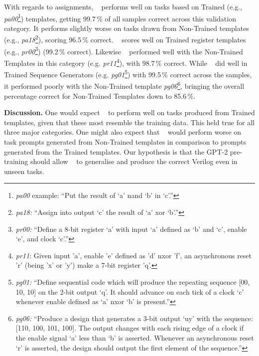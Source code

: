 With regards to assignments, \sol~ performs  well on tasks based on Trained (e.g., \textit{pa00}\footnote{\textit{pa00} example: ``Put the result of `a' nand `b' in `c'.''}) templates, getting 99.7\,\% of all samples correct across this validation category.
It performs slightly worse on tasks drawn from Non-Trained templates (e.g., \textit{pa18}\footnote{\textit{pa18:} ``Assign into output `c' the result of `a' xor `b'.''}), scoring 96.5\,\% correct.
\sol~ scores well on Trained register templates (e.g., \textit{pr00}\footnote{\textit{pr00:} ``Define a 8-bit register `a' with input `a' defined as `b' and `c', enable `e', and clock `c'.''}) (99.2\,\% correct).
Likewise \sol~ performed well with the Non-Trained Templates in this category (e.g. \textit{pr11}\footnote{\textit{pr11}: Given input 'a', enable 'e' defined as 'd' nxor 'f', an asynchronous reset 'r' (being 'x' or 'y') make a 7-bit register 'q'.}), with 98.7\,\% correct.
While \sol~ did well in Trained Sequence Generators (e.g. \textit{pg01}\footnote{\textit{pg01:} ``Define sequential code which will produce the repeating sequence [00, 10, 10] on the 2-bit output `q'. It should advance on each tick of a clock `c' whenever enable defined as `a' nxor `b' is present.''}) with 99.5\,\% correct across the samples, it performed poorly with the Non-Trained template \textit{pg06}\footnote{\textit{pg06:} ``Produce a design that generates a 3-bit output `uy' with the sequence: [110, 100, 101, 100]. The output changes with each rising edge of a clock if the enable signal `a' less than `b' is asserted. Whenever an asynchronous reset `r' is asserted, the design should output the first element of the sequence.''}, bringing the overall percentage correct for Non-Trained Templates down to 85.6\,\%.
 
\textbf{Discussion.} 
One would expect \sol~ to perform well on tasks produced from Trained templates, given that %
these most resemble the training data. %
This held true for all three major categories.
One might also expect that \sol~ would perform worse on task prompts generated from Non-Trained templates in comparison to prompts generated from the Trained templates. 
Our hypothesis is that the GPT-2 pre-training should allow \sol~ to generalise and produce the correct Verilog even in unseen tasks. %

